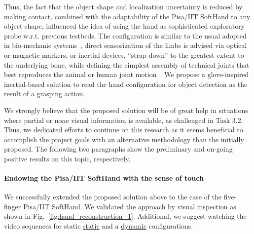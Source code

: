 \documentclass[a4paper,11pt,pdf]{pacmanreport}
\begin{document}
Thus, the fact that the object shape and localization uncertainty is reduced by making contact, combined with the adaptability of the Pisa/IIT SoftHand to any object shape, influenced the idea of using the hand as sophisticated exploratory probe w.r.t. previous testbeds. The configuration is similar to the usual adopted in bio-mechanic systems~\cite{Cappozzo1995}, direct sensorization of the limbs is advised via optical or magnetic markers, or inertial devices, ``strap down'' to the greatest extent to the underlying bone, while defining the simplest assembly of technical joints that best reproduces the animal or human joint motion~\cite{Lucchetti1998}. We propose a glove-inspired inertial-based solution to read the hand configuration for object detection as the result of a grasping action.%

We strongly believe that the proposed solution will be of great help in situations where partial or none visual information is available, as challenged in Task 3.2. Thus, we dedicated efforts to continue on this research as it seems beneficial to accomplish the project goals with an alternative methodology than the initially proposed. The following two paragraphs show the preliminary and on-going positive results on this topic, respectively.






%
\paragraph{Endowing the Pisa/IIT SoftHand with the sense of touch}

We successfully extended the proposed solution above to the case of the five-finger Pisa/IIT SoftHand. We validated the approach by visual inspection as shown in Fig.~\ref{fig:hand_reconstruction_1}. Additional, we suggest watching the video sequences for static \href{https://www.youtube.com/watch?v=0oVha0Q1vWM}{static} and a \href{https://www.youtube.com/watch?v=bceOXa990-Q}{dynamic} configurations.
\end{document}
